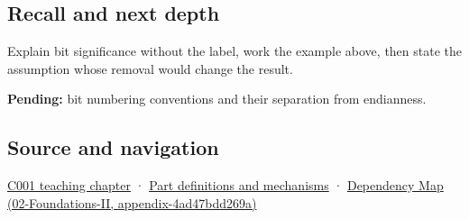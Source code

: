 \subsection{Recall and next depth}\label{appendix-280445746493-recall-and-next-depth}

Explain bit significance without the label, work the example above, then state the assumption whose removal would change the result.

\textbf{Pending:} bit numbering conventions and their separation from endianness.

\subsection{Source and navigation}\label{appendix-280445746493-source-and-navigation}

\hyperref[01-foundations-i-ch001-from-a-signal-to-an-interpretation]{C001 teaching chapter} · \hyperref[appendix-fd090d982a15]{Part definitions and mechanisms} · \href{../02-Foundations-II/main.pdf\#nameddest=appendix-4ad47bdd269a}{Dependency Map (02-Foundations-II, appendix-4ad47bdd269a)}
